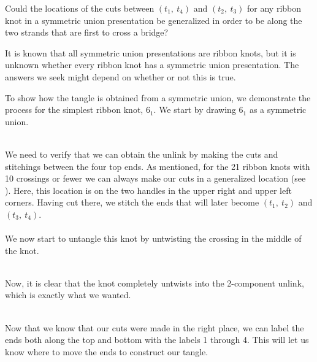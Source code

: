 \begin{paper}
{Could the locations of the cuts between $(t_1,~t_4)$ and $(t_2,~t_3)$ for any
ribbon knot in a symmetric union presentation be generalized in order to be
along the two strands that are first to cross a bridge?}

It is known that all symmetric union presentations are ribbon knots, but it is
unknown whether every ribbon knot has a symmetric union presentation.
The answers we seek might depend on whether or not this is true.

To show how the tangle is obtained from a symmetric union, we demonstrate the
process for the simplest ribbon knot, $6_1$.
We start by drawing $6_1$ as a symmetric union.

\\

We need to verify that we can obtain the unlink by making the cuts and
stitchings between the four top ends.
As mentioned, for the 21 ribbon knots with 10 crossings or fewer we can always
make our cuts in a generalized location (see \qtnCuts).
Here, this location is on the two handles in the upper right and upper left
corners.
Having cut there, we stitch the ends that will later become $(t_1,~t_2)$ and
$(t_3,~t_4)$.\\

\\

We now start to untangle this knot by untwisting the crossing in the middle of
the knot.

\\

Now, it is clear that the knot completely untwists into the 2-component unlink,
which is exactly what we wanted.

\\

Now that we know that our cuts were made in the right place, we can label
the ends both along the top and bottom with the labels 1 through 4.
This will let us know where to move the ends to construct our tangle.



\end{paper}
